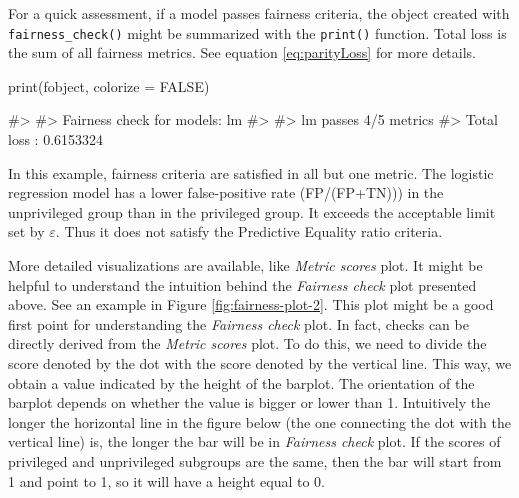 For a quick assessment, if a model passes fairness criteria, the object
created with \texttt{fairness\_check()} might be summarized with the
\texttt{print()} function. Total loss is the sum of all fairness
metrics. See equation \eqref{eq:parityLoss} for more details.

\begin{Schunk}
\begin{Sinput}
print(fobject, colorize = FALSE)
\end{Sinput}
\begin{Soutput}
#> 
#> Fairness check for models: lm 
#> 
#> lm passes 4/5 metrics
#> Total loss :  0.6153324
\end{Soutput}
\end{Schunk}

In this example, fairness criteria are satisfied in all but one metric.
The logistic regression model has a lower false-positive rate
(FP/(FP+TN))) in the unprivileged group than in the privileged group. It
exceeds the acceptable limit set by \(\varepsilon\). Thus it does not
satisfy the Predictive Equality ratio criteria.

More detailed visualizations are available, like \emph{Metric scores}
plot. It might be helpful to understand the intuition behind the
\emph{Fairness check} plot presented above. See an example in Figure
\ref{fig:fairness-plot-2}. This plot might be a good first point for
understanding the \emph{Fairness check} plot. In fact, checks can be
directly derived from the \emph{Metric scores} plot. To do this, we need
to divide the score denoted by the dot with the score denoted by the
vertical line. This way, we obtain a value indicated by the height of
the barplot. The orientation of the barplot depends on whether the value
is bigger or lower than 1. Intuitively the longer the horizontal line in
the figure below (the one connecting the dot with the vertical line) is,
the longer the bar will be in \emph{Fairness check} plot. If the scores
of privileged and unprivileged subgroups are the same, then the bar will
start from 1 and point to 1, so it will have a height equal to 0.

